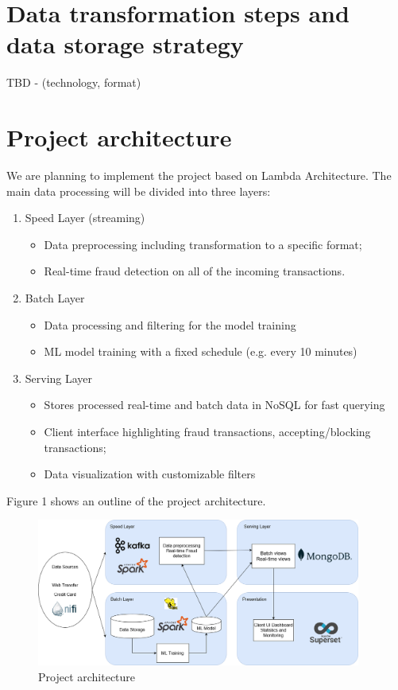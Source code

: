 \documentclass[12pt,a4paper, hidelinks]{article}
\begin{document}
\section{Data transformation steps and data storage strategy}

TBD - (technology, format)

\section{Project architecture}

We are planning to implement the project based on Lambda Architecture. The main data processing will be divided into three layers:

\begin{enumerate}
    \item Speed Layer (streaming)
        \begin{itemize}
            \item Data preprocessing including transformation to a specific format;
            \item Real-time fraud detection on all of the incoming transactions.
        \end{itemize}
    \item Batch Layer
        \begin{itemize}
            \item Data processing and filtering for the model training
            \item ML model training with a fixed schedule (e.g. every 10 minutes)
        \end{itemize}
    \item Serving Layer
        \begin{itemize}
            \item Stores processed real-time and batch data in NoSQL for fast querying
            \item Client interface highlighting fraud transactions, accepting/blocking transactions;
            \item Data visualization with customizable filters
        \end{itemize}
\end{enumerate}

Figure 1 shows an outline of the project architecture.

\begin{figure}[htbp]
    \centering
    \includegraphics[width=0.95\textwidth]{images/Architecture-M2.png}
    \caption{Project architecture}
    \label{fig:sunset}
\end{figure}
\end{document}
